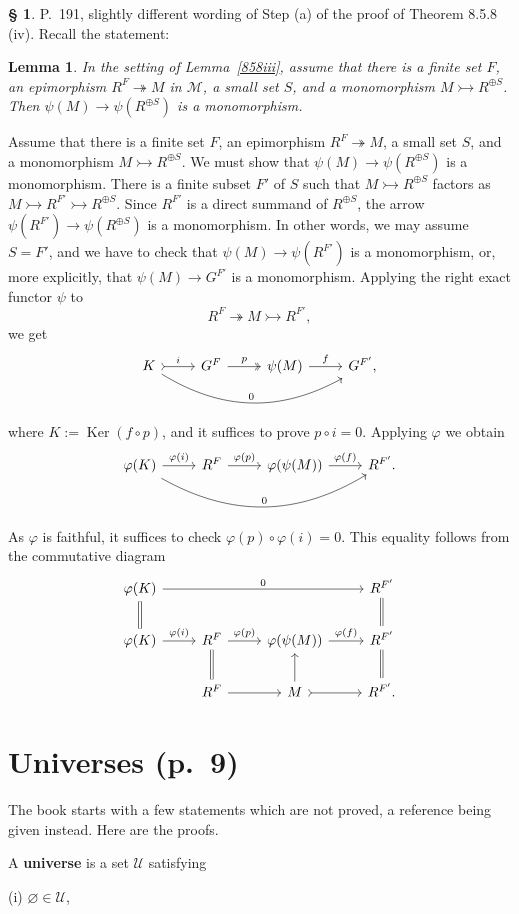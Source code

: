 \documentclass[12pt]{article}
\newtheorem{lem}[thm]{Lemma}
\theoremstyle{remark}
\theoremstyle{definition}
\newtheorem{cm}[thm]{\S}
\newcommand{\bc}{\begin{cm}}\newcommand{\ec}{\end{cm}}
\newcommand{\n}{\noindent}
\newcommand{\M}{\mathcal M}
\newcommand{\epi}{\twoheadrightarrow}
\newcommand{\m}{\rightarrowtail}
\newcommand{\p}{\varphi}
\newcommand{\pf}{\n{\em Proof. }}
\DeclareMathOperator{\Ker}{Ker}
\begin{document}
\bc P.~191, slightly different wording of Step (a) of the proof of Theorem 8.5.8 (iv). Recall the statement: 
%
\begin{lem}
%
In the setting of Lemma~\ref{858iii}, assume that there is a finite set $F$, an epimorphism $R^F\epi M$ in $\M$, a small set $S$, and a monomorphism $M\m R^{\oplus S}$. Then $\psi(M)\to\psi(R^{\oplus S})$ is a monomorphism. 
%
\end{lem}
%
\pf Assume that there is a finite set $F$, an epimorphism $R^F\epi M$, a small set $S$, and a monomorphism $M\m R^{\oplus S}$. We must show that $\psi(M)\to\psi(R^{\oplus S})$ is a monomorphism. There is a finite subset $F'$ of $S$ such that $M\m R^{\oplus S}$ factors as $M\m R^{F'}\m R^{\oplus S}$. Since $R^{F'}$ is a direct summand of $R^{\oplus S}$, the arrow $\psi(R^{F'})\to\psi(R^{\oplus S})$ is a monomorphism. In other words, we may assume $S=F'$, and we have to check that $\psi(M)\to\psi(R^{F'})$ is a monomorphism, or, more explicitly, that $\psi(M)\to G^{F'}$ is a monomorphism. Applying the right exact functor $\psi$ to 
$$
R^F\epi M\m R^{F'},
$$
we get 
$$
\begin{tikzcd}
K\ar[tail]{r}{i}\ar[bend right]{rrr}{0}&G^F\ar[two heads]{r}{p}&\psi(M)\ar{r}{f}&G^{F'},
\end{tikzcd}
$$
where $K:=\Ker(f\circ p)$, and it suffices to prove $p\circ i=0$. Applying $\p$ we obtain
$$
\begin{tikzcd}
\p(K)\ar{r}{\p(i)}\ar[bend right]{rrr}{0}&R^F\ar{r}{\p(p)}&\p(\psi(M))\ar{r}{\p(f)}&R^{F'}.
\end{tikzcd}
$$
As $\p$ is faithful, it suffices to check $\p(p)\circ\p(i)=0$. This equality follows from the commutative diagram
$$
\begin{tikzcd}
\p(K)\ar[equal]{d}\ar{rrr}{0}&&&R^{F'}\ar[equal]{d}\\
\p(K)\ar{r}{\p(i)}&R^F\ar[equal]{d}\ar{r}{\p(p)}&\p(\psi(M))\ar{r}{\p(f)}&R^{F'}\ar[equal]{d}\\
&R^F\ar{r}&M\ar[tail]{r}\ar{u}&R^{F'}.
\end{tikzcd}
$$
\ec
%
\section{Universes (p.~9)} %
%
The book starts with a few statements which are not proved, a reference being given instead. Here are the proofs.

A \textbf{universe} is a set $\mathcal U$ satisfying 

(i) $\varnothing\in\mathcal U$,
\end{document}
